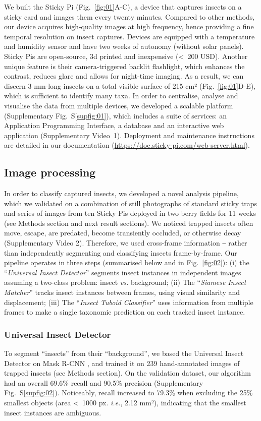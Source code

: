 \documentclass[fleqn,10pt]{wlscirep}
\begin{document}
We built the Sticky Pi (Fig.~\ref{fig:01}A-C), a device that captures insects on a sticky card and images them every twenty minutes. Compared to other methods, our device acquires high-quality images at high frequency, hence providing a fine temporal resolution on insect captures. Devices are equipped with a temperature and humidity sensor and have two weeks of autonomy (without solar panels). Sticky Pis are open-source, 3d printed and inexpensive (<~200 USD). Another unique feature is their camera-triggered backlit flashlight, which enhances the contrast, reduces glare and allows for night-time imaging. As a result, we can discern 3 mm-long insects on a total visible surface of 215 cm² (Fig.~\ref{fig:01}D-E), which is sufficient to identify many taxa. In order to centralise, analyse and visualise the data from multiple devices, we developed a scalable platform (Supplementary Fig.~S\ref{supfig:01}), which includes a suite of services: an Application Programming Interface, a database and an interactive web application (Supplementary Video~1). Deployment and maintenance instructions are detailed in our documentation (\href{https://doc.sticky-pi.com/web-server.html}{https://doc.sticky-pi.com/web-server.html}).

\subsection*{Image processing}
In order to classify captured insects, we developed a novel analysis pipeline, which we validated on a combination of still photographs of standard sticky traps and series of images from ten Sticky Pis deployed in two berry fields for 11 weeks (see Methods section and next result sections). We noticed trapped insects often move, escape, are predated, become transiently occluded, or otherwise decay (Supplementary Video 2). Therefore, we used cross-frame information ‒ rather than independently segmenting and classifying insects frame-by-frame. Our pipeline operates in three steps (summarised below and in Fig.~\ref{fig:02}): 
(i) the “\emph{Universal Insect Detector}” segments insect instances in independent images assuming a two-class problem: insect \emph{vs.} background;
(ii) The “\emph{Siamese Insect Matcher}” tracks insect instances between frames, using visual similarity and displacement;
(iii) The “\emph{Insect Tuboid Classifier}” uses information from multiple frames to make a single taxonomic prediction on each tracked insect instance.

\subsubsection*{Universal Insect Detector}
To segment “insects” from their “background”, we based the Universal Insect Detector on Mask R-CNN \cite{he_mask_2017}, and trained it on 239 hand-annotated images of trapped insects (see Methods section). On the validation dataset, our algorithm had an overall 69.6\% recall and 90.5\% precision (Supplementary Fig.~S\ref{supfig:02}). Noticeably, recall increased to 79.3\% when excluding the 25\% smallest objects (area <~1000 px. \emph{i.e.}, 2.12 mm²), indicating that the smallest insect instances are ambiguous. 
\end{document}
